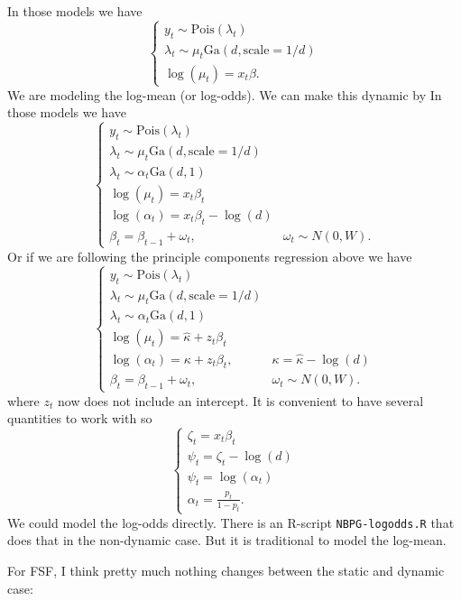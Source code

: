 \documentclass{article}
\newcommand{\Pois}{\text{Pois}}
\newcommand{\Ga}{\text{Ga}}
\begin{document}
In those models we have
\[
\begin{cases}
y_t \sim \Pois(\lambda_t) \\
\lambda_t \sim \mu_t \Ga(d, \text{scale}=1/d) \\
\log(\mu_t) = x_t \beta.
\end{cases}
\]
We are modeling the log-mean (or log-odds).  We can make this dynamic by In
those models we have
\[
\begin{cases}
y_t \sim \Pois(\lambda_t) \\
\lambda_t \sim \mu_t \Ga(d, \text{scale}=1/d) \\
\lambda_t \sim \alpha_t \Ga(d, 1) \\
\log(\mu_t) = x_t \beta_t \\
\log(\alpha_t) = x_t \beta_t - \log(d) \\
\beta_t = \beta_{t-1} + \omega_t, & \omega_t \sim N(0, W).
\end{cases}
\]
Or if we are following the principle components regression above we have
\[
\begin{cases}
y_t \sim \Pois(\lambda_t) \\
\lambda_t \sim \mu_t \Ga(d, \text{scale}=1/d) \\
\lambda_t \sim \alpha_t \Ga(d, 1) \\
\log(\mu_t) = \hat \kappa + z_t \beta_t \\
\log(\alpha_t) = \kappa + z_t \beta_t, & \kappa = \hat \kappa - \log(d) \\
\beta_t = \beta_{t-1} + \omega_t, & \omega_t \sim N(0, W).
\end{cases}
\]
where $z_t$ now does not include an intercept.  It is convenient to have several
quantities to work with so 
\[
\begin{cases}
\zeta_t = x_t \beta_t \\
\psi_t = \zeta_t - \log(d) \\
\psi_t = \log(\alpha_t) \\
\alpha_t = \frac{p_t}{1-p_t}.
\end{cases}
\]
We could model the log-odds directly.  There is an R-script
\texttt{NBPG-logodds.R} that does that in the non-dynamic case.  But it is
traditional to model the log-mean.

For FSF, I think pretty much nothing changes between the static and dynamic
case:
\end{document}
